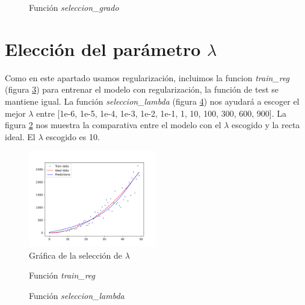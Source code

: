 \documentclass[6pt]{AiTex}
\begin{document}
\begin{figure}[H]
    \centering
    
    \caption{Función \textit{seleccion\_grado}}
    \label{fig:seleccion_grado}
\end{figure}

\section{Elección del parámetro $\lambda$}

Como en este apartado usamos regularización, incluimos la funcion \textit{train\_reg} (figura \ref{fig:train_reg}) para entrenar el modelo con regularización, la función de test se mantiene igual. La función \textit{seleccion\_lambda} (figura \ref{fig:seleccion_lambda}) nos ayudará a escoger el mejor $\lambda$ entre [1e-6, 1e-5, 1e-4, 1e-3, 1e-2, 1e-1, 1, 10, 100, 300, 600, 900]. La figura \ref{fig:seleccion_lambda_plot} nos muestra la comparativa entre el modelo con el $\lambda$ escogido y la recta ideal. El $\lambda$ escogido es 10.

\begin{figure}[H]
    \centering
    \includegraphics[width=0.5\textwidth]{./images/lambda.png}
    \caption{Gráfica de la selección de $\lambda$}
    \label{fig:seleccion_lambda_plot}
\end{figure}

\begin{figure}[H]
    \centering
    
    \caption{Función \textit{train\_reg}}
    \label{fig:train_reg}
\end{figure}

\begin{figure}[H]
    \centering
    
    \caption{Función \textit{seleccion\_lambda}}
    \label{fig:seleccion_lambda}
\end{figure}
\end{document}
